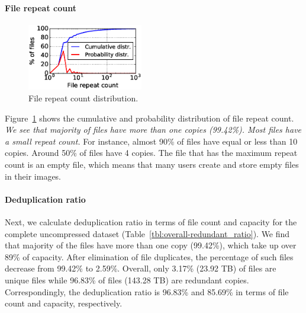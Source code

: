 \paragraph{File repeat count}
\begin{figure} \centering
\includegraphics[width=0.45\textwidth]{graphs/File_repeat_count.eps}
\caption{File repeat count distribution.  } \label{fig:file-repeat-cnt}
\end{figure}

Figure~\ref{fig:file-repeat-cnt} shows the cumulative and probability
distribution of file repeat count.  \textit{We see that majority of files have
more than one copies (99.42\%).  Most files have a small repeat count.} For
instance, almost 90\% of files have equal or less than 10 copies. Around 50\%
of files have 4 copies. The file that has the maximum repeat count is an empty
file, which means that many users create and store empty files in their images.

\paragraph{Deduplication ratio}
Next, we calculate deduplication ratio in terms of file count and capacity for
the complete uncompressed dataset (Table~\ref{tbl:overall-redundant_ratio}).
We find that majority of the files have more than one copy (99.42\%), which
take up over 89\% of capacity.  After elimination of file duplicates, the
percentage of such files decrease from 99.42\% to 2.59\%.  Overall, only 3.17\%
(23.92 TB) of files are unique files while 96.83\% of files (143.28 TB) are
redundant copies. Correspondingly, the deduplication ratio is 96.83\% and
85.69\% in terms of file count and capacity, respectively.

